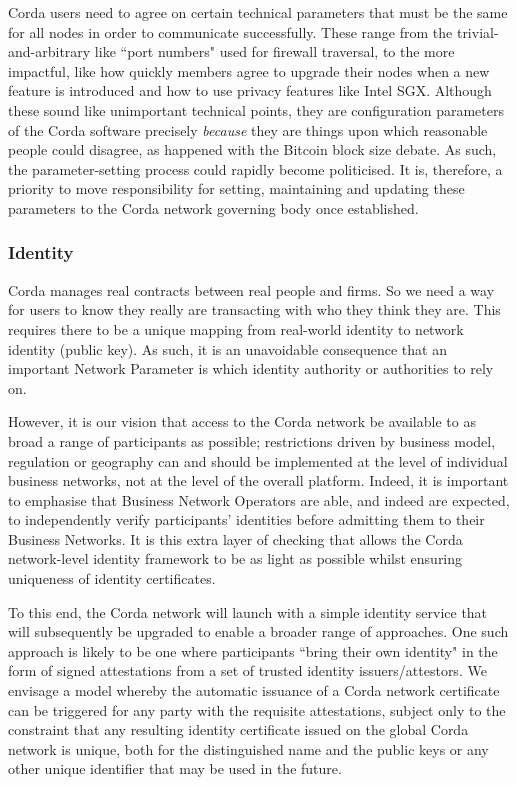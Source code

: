 \documentclass{article}
\begin{document}
Corda users need to agree on certain technical parameters that must be the same for all nodes in order to communicate successfully. These range from the trivial-and-arbitrary like ``port numbers" used for firewall traversal, to the more impactful, like how quickly members agree to upgrade their nodes when a new feature is introduced and how to use privacy features like Intel SGX. Although these sound like unimportant technical points, they are configuration parameters of the Corda software precisely \textit{because} they are things upon which reasonable people could disagree, as happened with the Bitcoin block size debate. As such, the parameter-setting process could rapidly become politicised. It is, therefore, a priority to move responsibility for setting, maintaining and updating these parameters to the Corda network governing body once established.

\subsubsection{Identity}

Corda manages real contracts between real people and firms. So we need a way for users to know they really are transacting with who they think they are. This requires there to be a unique mapping from real-world identity to network identity (public key). As such, it is an unavoidable consequence that an important Network Parameter is which identity authority or authorities to rely on.

However, it is our vision that access to the Corda network be available to as broad a range of participants as possible; restrictions driven by business model, regulation or geography can and should be implemented at the level of individual business networks, not at the level of the overall platform. Indeed, it is important to emphasise that Business Network Operators are able, and indeed are expected, to independently verify participants' identities before admitting them to their Business Networks. It is this extra layer of checking that allows the Corda network-level identity framework to be as light as possible whilst ensuring uniqueness of identity certificates.

To this end, the Corda network will launch with a simple identity service that will subsequently be upgraded to enable a broader range of approaches. One such approach is likely to be one where participants ``bring their own identity" in the form of signed attestations from a set of trusted identity issuers/attestors. We envisage a model whereby the automatic issuance of a Corda network certificate can be triggered for any party with the requisite attestations, subject only to the constraint that any resulting identity certificate issued on the global Corda network is unique, both for the distinguished name and the public keys or any other unique identifier that may be used in the future.
\end{document}
